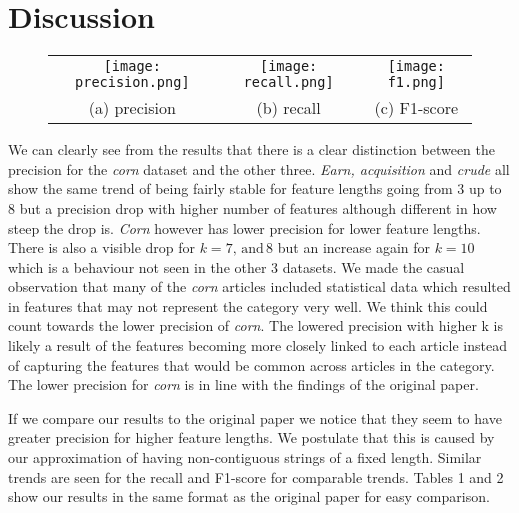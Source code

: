 \documentclass{article}
\theoremstyle{definition}
\begin{document}
\section{Discussion}
\begin{figure}[h]
\centering
\begin{tabular}{ccc}
\texttt{[image: precision.png]} 
& \texttt{[image: recall.png]}
& \texttt{[image: f1.png]}\\
(a) precision & (b) recall & (c) F1-score
\end{tabular}
\end{figure}


We can clearly see from the results that there is a clear distinction between the precision for the \textit{corn} dataset and the other three. \textit{Earn, acquisition} and \textit{crude} all show the same trend of being fairly stable for feature lengths going from 3 up to 8 but a precision drop with higher number of features although different in how steep the drop is. \textit{Corn} however has lower precision for lower feature lengths. There is also a visible drop for $k=7,\, \text{and} \, 8$ but an increase again for $k=10$ which is a behaviour not seen in the other 3 datasets. We made the casual observation that many of the \textit{corn} articles included statistical data which resulted in features that may not represent the category very well. We think this could count towards the lower precision of \textit{corn}. 
The lowered precision with higher k is likely a result of the features becoming more closely linked to each article instead of capturing the features that would be common across articles in the category. 
The lower precision for \textit{corn} is in line with the findings of the original paper. 

If we compare our results to the original paper we notice that they seem to have greater precision for higher feature lengths. We postulate that this is caused by our approximation of having non-contiguous strings of a fixed length. Similar trends are seen for the recall and F1-score for comparable trends. 
Tables 1 and 2 show our results in the same format as the original paper for easy comparison.
\end{document}
